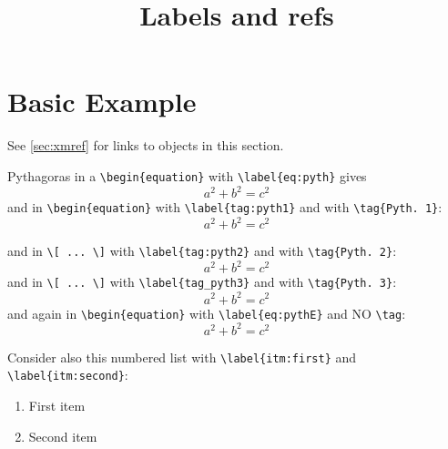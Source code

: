 \documentclass[landscape]{ximera}
\title{Labels and refs}
\begin{document}
\begin{abstract}
\end{abstract}
\maketitle
\label{xim:labels}



\section{Basic Example}
\label{sec:basic example}
See \autoref{sec:xmref} for links to objects in this section.


Pythagoras in a \verb|\begin{equation}| with \verb|\label{eq:pyth}| gives
\begin{equation}
  a^2 + b^2 = c^2   \label{eq:pyth}
\end{equation}
and in \verb|\begin{equation}| with \verb|\label{tag:pyth1}| and with \verb|\tag{Pyth. 1}|:
\begin{equation}
  a^2 + b^2 = c^2   \label{tag:pyth1} \tag{Pyth. 1} 
\end{equation}

and in \verb|\[ ... \]| with \verb|\label{tag:pyth2}| and with \verb|\tag{Pyth. 2}|:
\[
  a^2 + b^2 = c^2   \label{tag:pyth2} \tag{Pyth. 2}
\]
and in \verb|\[ ... \]| with \verb|\label{tag_pyth3}| and with \verb|\tag{Pyth. 3}|:
\[
  a^2 + b^2 = c^2   \label{tag_pyth3} \tag{Pyth. 3} 
\]
and again in \verb|\begin{equation}| with \verb|\label{eq:pythE}| and NO \verb|\tag|:
\begin{equation}
  a^2 + b^2 = c^2  \label{eq:pythE} 
\end{equation}

Consider also this numbered list with \verb|\label{itm:first}| and \verb|\label{itm:second}|:
\begin{enumerate}
  \item First item \label{itm:first}
  \item Second item \label{itm:second}
\end{enumerate}
\end{document}
